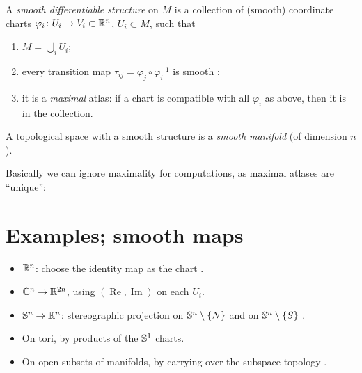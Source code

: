 \begin{definition}
\label{L07:def:smoothstructure}
A \emph{smooth differentiable structure} on $M$ is a collection of (smooth) coordinate
charts $\varphi_i\colon U_i\to V_i\subset\mathbb{R}^n$, $U_i\subset M$, such that
\begin{enumerate}
  \item $M=\bigcup_i U_i$;
  \item every transition map $\tau_{ij}=\varphi_j\circ\varphi_i^{-1}$ is smooth
    ;
  \item it is a \emph{maximal} atlas: if a chart is compatible with all $\varphi_i$ as
    above, then it is in the collection.
\end{enumerate}
A topological space with a smooth structure is a \emph{smooth manifold} (of dimension $n$).
\end{definition}

Basically we can ignore maximality for computations, as maximal atlases are ``unique'':

\section{Examples; smooth maps}
\label{L07:sec:examples}

\begin{example}
\label{L07:ex:manifolds}
\leavevmode
\begin{itemize}
  \item $\mathbb{R}^n$: choose the identity map as the chart .
  \item $\mathbb{C}^n\to\mathbb{R}^{2n}$, using $(\operatorname{Re},\operatorname{Im})$ on each $U_i$.
  \item $\mathbb{S}^n\to\mathbb{R}^n$: stereographic projection on $\mathbb{S}^n\setminus\{N\}$ and on
    $\mathbb{S}^n\setminus\{S\}$ .
  \item On tori, by products of the $\mathbb{S}^1$ charts.
  \item On open subsets of manifolds, by carrying over the subspace topology
    .
\end{itemize}
\end{example}

